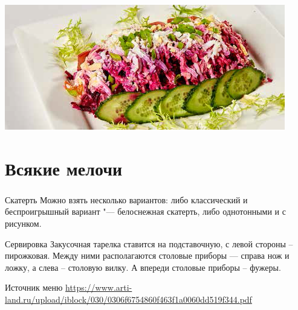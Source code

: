 \documentclass[russian]{beamer}  %
\begin{document}
\begin{frame}
\begin{multicols}{2}
\begin{itemize}
				\includegraphics[scale=0.45]{salad_4}
			\end{itemize}
		\end{multicols}
		\framesubtitle{\insertsubsection}
	\end{frame}
	
	\section{Всякие мелочи}
	\begin{frame}
		\frametitle{\insertsection} 
		\begin{block}{Скатерть}
			Можно взять несколько вариантов: либо классический и беспроигрышный вариант "--- белоснежная скатерть, либо однотонными и с рисунком.
		\end{block}
	    \begin{block}{Сервировка}
			Закусочная тарелка ставится на подставочную, с левой стороны – пирожковая. Между ними располагаются столовые приборы — справа нож и ложку, а слева – столовую вилку. А впереди столовые приборы – фужеры.
		\end{block}
		\begin{block}{Источник меню}
			\url{https://www.arti-land.ru/upload/iblock/030/0306f6754860f463f1a0060dd519f344.pdf} 
		\end{block}
	\end{frame}
\end{document}
